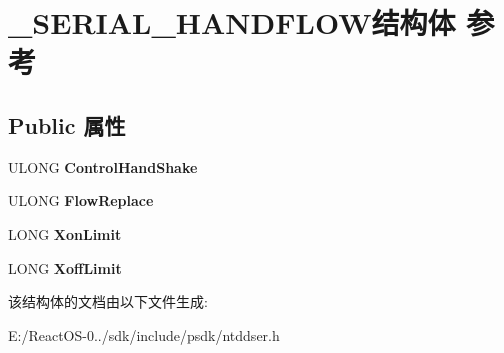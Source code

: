 \hypertarget{struct___s_e_r_i_a_l___h_a_n_d_f_l_o_w}{}\section{\+\_\+\+S\+E\+R\+I\+A\+L\+\_\+\+H\+A\+N\+D\+F\+L\+O\+W结构体 参考}
\label{struct___s_e_r_i_a_l___h_a_n_d_f_l_o_w}
\subsection*{Public 属性}
\begin{DoxyCompactItemize}
\item 
\mbox{\label{struct___s_e_r_i_a_l___h_a_n_d_f_l_o_w_a345f8362a2d0681b396e85e13ed4eac4}} 
U\+L\+O\+NG {\bfseries Control\+Hand\+Shake}
\item 
\mbox{\label{struct___s_e_r_i_a_l___h_a_n_d_f_l_o_w_a5707e90921c2ccbf81a4dd7d2aeb694c}} 
U\+L\+O\+NG {\bfseries Flow\+Replace}
\item 
\mbox{\label{struct___s_e_r_i_a_l___h_a_n_d_f_l_o_w_a9bfc99dd6926b0e93a9eaa3cd26d3238}} 
L\+O\+NG {\bfseries Xon\+Limit}
\item 
\mbox{\label{struct___s_e_r_i_a_l___h_a_n_d_f_l_o_w_af6119325e17e094812f50b24000b83d2}} 
L\+O\+NG {\bfseries Xoff\+Limit}
\end{DoxyCompactItemize}


该结构体的文档由以下文件生成\+:\begin{DoxyCompactItemize}
\item 
E\+:/\+React\+O\+S-\/0../sdk/include/psdk/ntddser.\+h\end{DoxyCompactItemize}
